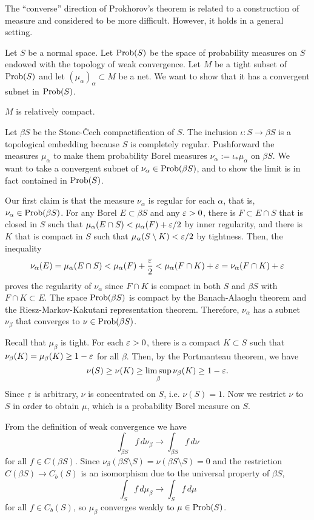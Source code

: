 \documentclass{../../large}
\begin{document}
\begin{prb}
The ``converse'' direction of Prokhorov's theorem is related to a construction of measure and considered to be more difficult.
However, it holds in a general setting.

Let $S$ be a normal space.
Let $\operatorname{Prob}(S)$ be the space of probability measures on $S$ endowed with the topology of weak convergence.
Let $M$ be a tight subset of $\operatorname{Prob}(S)$ and let $(\mu_\alpha)_\alpha\subset M$ be a net.
We want to show that it has a convergent subnet in $\operatorname{Prob}(S)$.
\begin{parts}
\item $M$ is relatively compact.
\end{parts}
\end{prb}
\begin{pf}
Let $\beta S$ be the Stone-\v Cech compactification of $S$.
The inclusion $\iota:S\to\beta S$ is a topological embedding because $S$ is completely regular.
Pushforward the measures $\mu_\alpha$ to make them probability Borel measures $\nu_\alpha:=\iota_*\mu_\alpha$ on $\beta S$.
We want to take a convergent subnet of $\nu_\alpha\in\operatorname{Prob}(\beta S)$, and to show the limit is in fact contained in $\operatorname{Prob}(S)$.

Our first claim is that the measure $\nu_\alpha$ is regular for each $\alpha$, that is, $\nu_\alpha\in\operatorname{Prob}(\beta S)$.
For any Borel $E\subset\beta S$ and any $\varepsilon>0$, there is $F\subset E\cap S$ that is closed in $S$ such that $\mu_\alpha(E\cap S)<\mu_\alpha(F)+\varepsilon/2$ by inner regularity, and there is $K$ that is compact in $S$ such that $\mu_\alpha(S\setminus K)<\varepsilon/2$ by tightness.
Then, the inequality
\[\nu_\alpha(E)=\mu_\alpha(E\cap S)<\mu_\alpha(F)+\frac{\varepsilon}2<\mu_\alpha(F\cap K)+\varepsilon=\nu_\alpha(F\cap K)+\varepsilon\]
proves the regularity of $\nu_\alpha$ since $F\cap K$ is compact in both $S$ and $\beta S$ with $F\cap K\subset E$.
The space $\operatorname{Prob}(\beta S)$ is compact by the Banach-Alaoglu theorem and the Riesz-Markov-Kakutani representation theorem.
Therefore, $\nu_\alpha$ has a subnet $\nu_\beta$ that converges to $\nu\in\operatorname{Prob}(\beta S)$.

Recall that $\mu_\beta$ is tight.
For each $\varepsilon>0$, there is a compact $K\subset S$ such that $\nu_\beta(K)=\mu_\beta(K)\ge1-\varepsilon$ for all $\beta$.
Then, by the Portmanteau theorem, we have
\[\nu(S)\ge\nu(K)\ge\limsup_\beta\nu_\beta(K)\ge1-\varepsilon.\]
Since $\varepsilon$ is arbitrary, $\nu$ is concentrated on $S$, i.e. $\nu(S)=1$.
Now we restrict $\nu$ to $S$ in order to obtain $\mu$, which is a probability Borel measure on $S$.

From the definition of weak convergence we have
\[\int_{\beta S}f\,d\nu_\beta\to\int_{\beta S}f\,d\nu\]
for all $f\in C(\beta S)$.
Since $\nu_\beta(\beta S\setminus S)=\nu(\beta S\setminus S)=0$ and the restriction $C(\beta S)\to C_b(S)$ is an isomorphism due to the universal property of $\beta S$,
\[\int_Sf\,d\mu_\beta\to\int_Sf\,d\mu\]
for all $f\in C_b(S)$, so $\mu_\beta$ converges weakly to $\mu\in\operatorname{Prob}(S)$.
\end{pf}
\end{document}
